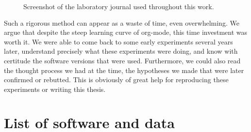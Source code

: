     \begin{figure}[htpb]
        \centering
        \caption{Screenshot of the laboratory journal used throughout this work.}%
        \label{fig:appendix:journal_extract}
    \end{figure}

    Such a rigorous method can appear as a waste of time, even overwhelming. We argue that despite the steep learning
    curve of org-mode, this time investment was worth it. We were able to come back to some early experiments several
    years later, understand precisely what these experiments were doing, and know with certitude the software versions
    that were used. Furthermore, we could also read the thought process we had at the time, the hypotheses we made that were later
    confirmed or rebutted. This is obviously of great help for reproducing these experiments or writing this thesis.

\chapter{List of software and data}
\label{chapter:zenodo}

